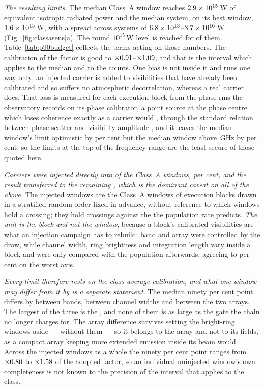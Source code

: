 \emph{The resulting limits.} The median Class~A window reaches
$2.9\times10^{15}$\,W of equivalent isotropic radiated power and the median
system, on its best window, $1.6\times10^{15}$\,W, with a spread across
systems of $6.8\times10^{13}$--$3.7\times10^{16}$\,W
(Fig.~\ref{fig:classasens}a). The round $10^{15}$\,W level is reached for
\NSysEfifteen{} of them. Table~\ref{tab:p90budget} collects the terms acting
on those numbers. The calibration of the factor is good to
$\times0.91$--$\times1.09$, and that is the interval which
applies to the median and to the counts. One bias is not inside it and runs
one way only: an injected carrier is added to visibilities that have already
been calibrated and so suffers no atmospheric decorrelation, whereas a real
carrier does. That loss is measured for each execution block from the phase
rms the observatory records on its phase calibrator, a point source at the
phase centre which loses coherence exactly as a carrier would
\citep[\S10.4.9]{ALMAHandbook}, through the standard relation between phase
scatter and visibility amplitude \citep{Richards2022}, and it leaves the
median window's limit optimistic by
\SensDecorPct{} per cent but the median window above \SensDecorHiGHz{}\,GHz
by \SensDecorHiPct{} per cent, so the limits at the top of the frequency
range are the least secure of those quoted here.

\emph{Carriers were injected directly into \SensNInj{} of the \NWinA{}
Class~A windows, \SensNInjPct{} per cent, and the result transferred to the
remaining \SensNTransfer, which is the dominant caveat on all of the above.}
The injected windows are the Class~A windows of execution blocks drawn in a
stratified random order fixed in advance, without reference to which windows
hold a crossing; they hold \SensNCrossAch{} crossings against the
\SensNCrossExp{} the population rate predicts. \emph{The unit is the block
and not the window}, because a block's calibrated visibilities are what an
injection campaign has to rebuild: band and array were controlled by the
draw, while channel width, ring brightness and integration length vary inside
a block and were only compared with the population afterwards, agreeing to
\SensCovWorstPct{} per cent on the worst axis.

\emph{Every limit therefore rests on the class-average calibration, and what
one window may differ from it by is a separate statement.} The median ninety
per cent point differs by \SensBandSpread{} between bands,
\SensChanSpread{} between channel widths and \SensArrSpread{} between the two
arrays. The largest of the three is the \SensCovAxis, and none of them is as
large as the gate the chain no longer charges for. The array difference
survives setting the bright-ring windows aside --- \SensArrSpreadFaint{}
without them --- so it belongs to the array and not to its fields, as a
compact array keeping more extended emission inside its beam would.
Across the injected windows as
a whole the ninety per cent point ranges from $\times0.80$ to
$\times1.58$ of the adopted factor, so an individual uninjected
window's own completeness is not known to the precision of the interval that
applies to the class.

